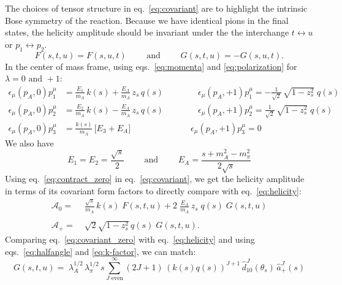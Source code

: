 \documentclass[10pt, aps,prd,amsmath,amssymb,superscriptaddress,onecolumn,
nofootinbib,showpacs,preprintnumbers]{revtex4-1}
\newcommand{\mand}{\qquad \text{ and } \qquad}
\begin{document}
The choices of tensor structure in eq.~\ref{eq:covariant} are to highlight the intrinsic Bose symmetry of the reaction. Because we have identical pions in the final states, the helicity amplitude should be invariant under the the interchange \(t \leftrightarrow u \) or \(p_1 \leftrightarrow p_2\).
  \begin{equation}
    F(s,t,u) = F(s,u,t) \qquad \text{ and } \qquad G(s,t,u) = - G(s,u,t).
  \end{equation}
In the center of mass frame, using eqs.~\ref{eq:momenta} and \ref{eq:polarization} for \(\lambda = 0 \text{ and } +1 \):
  \begin{align}
    \label{eq:contract_zero}
    \epsilon_\mu(p_A,0) p_1^\mu &= \frac{E_1}{m_A} \, k(s) + \frac{E_A}{m_A} \,  z_s \, q(s)
    \qquad \qquad \epsilon_\mu(p_A,+1) p_1^\mu = - \frac{1}{\sqrt{2}} \, \sqrt{1 - z_s^2} \; q(s) \nonumber \\
    \epsilon_\mu(p_A,0) p_2^\mu &= \frac{E_2}{m_A} \, k(s) - \frac{E_A}{m_A} \,  z_s \, q(s)
    \qquad \qquad \epsilon_\mu(p_A,+1) p_2^\mu =  \frac{1}{\sqrt{2}} \, \sqrt{1 - z_s^2} \; q(s)  \\
    \epsilon_\mu(p_A,0) p_3^\mu &= \frac{k(s)}{m_A} \, \big[E_3 + E_A \big]
    \qquad \qquad \qquad \quad \epsilon_\mu(p_A,+1) p_3^\mu = 0 \nonumber
  \end{align}
We also have
  \begin{equation}
    \label{eq:energies}
    E_1 = E_2 = \frac{\sqrt{s}}{2} \mand E_A = \frac{s + m_A^2 - m_\pi^2}{2 \sqrt{s}}
  \end{equation}
Using eq.~\ref{eq:contract_zero} in eq.~\ref{eq:covariant}, we get the helicity amplitude in terms of its covariant form factors to directly compare with eq.~\ref{eq:helicity}:
 \begin{align}
  \label{eq:covariant_zero}
   \mathcal{A}_0 =& \; \frac{\sqrt{s}}{m_A} \, k(s) \; F(s,t,u) + 2 \; \frac{E_A}{m_A} \, z_s \; q(s) \; G(s,t,u) \\
   \nonumber \\
   \label{eq:covariant_plus}
   \mathcal{A}_+ =& \; \sqrt{2} \sqrt{1-z_s^2} \, q(s) \; G(s,t,u).
 \end{align}
Comparing eq.~\ref{eq:covariant_zero} with eq.~\ref{eq:helicity} and using eqs.~\ref{eq:halfangle} and \ref{eq:k-factor}, we can match:
  \begin{equation}
    \label{eq:matching_G}
    G(s,t,u) =  \; \lambda_A^{1/2}  \, \lambda_\pi^{1/2}  \, s \sum_{J \text{ even}}^\infty (2J+1) \, (k(s)q(s))^{J+1} \,\hat{d}^J_{10}(\theta_s) \, \hat{a}^J_+(s)
  \end{equation}
\end{document}
